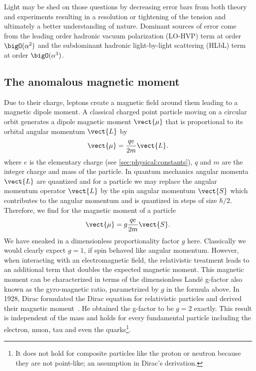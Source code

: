 Light may be shed on those questions by decreasing error bars from both theory and experiments resulting in a resolution or tightening of the tension and ultimately a better understanding of nature.
Dominant sources of error come from the leading order hadronic vacuum polarization (LO-HVP) term at order $\bigO(\alpha^{2})$ and the subdominant hadronic light-by-light scattering (HLbL) term at order $\bigO(\alpha^{3})$.

\subsection{The anomalous magnetic moment}

Due to their charge, leptons create a magnetic field around them leading to a magnetic dipole moment.
A classical charged point particle moving on a circular orbit generates a dipole magnetic moment $\vect{\mu}$ that is proportional to its orbital angular momentum $\vect{L}$ by
\begin{equation}
\vect{\mu} = \frac{q e}{2 m} \vect{L}.
\end{equation}
where $e$ is the elementary charge (see \cref{sec:physical:constants}), $q$ and $m$ are the integer charge and mass of the particle.
In quantum mechanics angular momenta $\vect{L}$ are quantized and for a \spinhalf particle we may replace the angular momentum operator $\vect{L}$ by the spin angular momentum $\vect{S}$ which contributes to the angular momentum and is quantized in steps of size $\hbar/2$.
Therefore, we find for the magnetic moment of a \spinhalf particle
\begin{equation}
\vect{\mu} = g \frac{q e}{2 m} \vect{S}.
\end{equation}
We have sneaked in a dimensionless proportionality factor $g$ here.
Classically we would clearly expect $g=1$, if spin behaved like angular momentum.
However, when interacting with an electromagnetic field, the relativistic treatment leads to an additional term that doubles the expected magnetic moment.
This magnetic moment can be characterized in terms of the dimensionless Landé g-factor also known as the gyro-magnetic ratio, parametrized by $g$ in the formula above.
In 1928, Dirac formulated the Dirac equation for relativistic \spinhalf particles and derived their magnetic moment~\cite{dirac1928quantum}.
He obtained the g-factor to be $g=2$ exactly.
This result is independent of the mass and holds for every fundamental \spinhalf particle including the electron, muon, tau and even the quarks\footnote{It does not hold for composite \spinhalf particles like the proton or neutron because they are not point-like; an assumption in Dirac's derivation.}.

